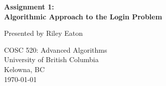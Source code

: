 \begin{titlepage}
    \begin{center}
        \vspace*{2cm}
        
        \textbf{Assignment 1:\\Algorithmic Approach to the Login Problem}
        
        \vspace{0.5cm}
        
        Presented by Riley Eaton
        
        \vfill
            
        COSC 520: Advanced Algorithms \\
        University of British Columbia \\
        Kelowna, BC \\
        \today
            
    \end{center}
\end{titlepage}
